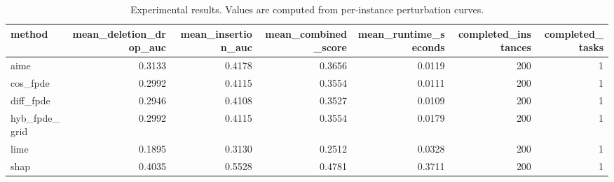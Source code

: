 \begin{table}[t]
\caption{Experimental results. Values are computed from per-instance perturbation curves.}
\label{tab:main_results_computed}
\centering
\begin{tabular}{lrrrrrr}
\toprule
method & mean\_deletion\_drop\_auc & mean\_insertion\_auc & mean\_combined\_score & mean\_runtime\_seconds & completed\_instances & completed\_tasks \\
\midrule
aime & 0.3133 & 0.4178 & 0.3656 & 0.0119 & 200 & 1 \\
cos\_fpde & 0.2992 & 0.4115 & 0.3554 & 0.0111 & 200 & 1 \\
diff\_fpde & 0.2946 & 0.4108 & 0.3527 & 0.0109 & 200 & 1 \\
hyb\_fpde\_grid & 0.2992 & 0.4115 & 0.3554 & 0.0179 & 200 & 1 \\
lime & 0.1895 & 0.3130 & 0.2512 & 0.0328 & 200 & 1 \\
shap & 0.4035 & 0.5528 & 0.4781 & 0.3711 & 200 & 1 \\
\bottomrule
\end{tabular}

\end{table}
